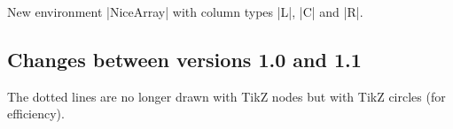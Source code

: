 \documentclass[dvipsnames]{article}%
\begin{document}
New environment |{NiceArray}| with column types |L|, |C| and |R|.

\subsection*{Changes between versions 1.0 and 1.1}

The dotted lines are no longer drawn with TikZ nodes but with TikZ circles
(for efficiency). 


\cleardoublepage

{}

\printindex


\newpage
\tableofcontents
\end{document}
